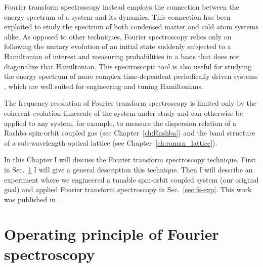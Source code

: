 Fourier transform spectroscopy instead employs the connection between the energy spectrum of a system and its dynamics. This connection has been exploited to study the spectrum of both condensed matter \cite{jonas_two-dimensional_2003} and cold atom systems \cite{yoshimura_diabatic-ramping_2014,wang_atom-interferometric_2015} alike.
As opposed to other techniques, Fourier spectroscopy relies only on following the unitary evolution of an initial state suddenly subjected to a Hamiltonian of interest and measuring probabilities in a basis that does not diagonalize that Hamiltonian. This spectroscopic tool is also useful for studying the energy spectrum of more complex time-dependent periodically driven systems \cite{eckardt_superfluid-insulator_2005,goldman_periodically_2014}, which are well suited for engineering and tuning Hamiltonians.

The frequency resolution of Fourier transform spectroscopy is limited only by the coherent evolution timescale of the system under study and can otherwise be applied to any system, for example, to measure the dispersion relation of a Rashba spin-orbit coupled gas (see Chapter~\ref{ch:Rashba}) and the band structure of a sub-wavelength optical lattice (see Chapter~\ref{ch:raman_lattice}).

In this Chapter I will discuss the Fourier transform spectroscopy technique. First in Sec.~\ref{sec:fs-theory} I will give a general description this technique. Then I will describe an experiment where we engineered a tunable spin-orbit coupled system (our original goal) and applied Fourier transform spectroscopy in Sec.~\ref{sec:fs-exp}. This work was published in~\cite{valdes-curiel_fourier_2017}.

	 

\section{Operating principle of Fourier spectroscopy}
\label{sec:fs-theory}

